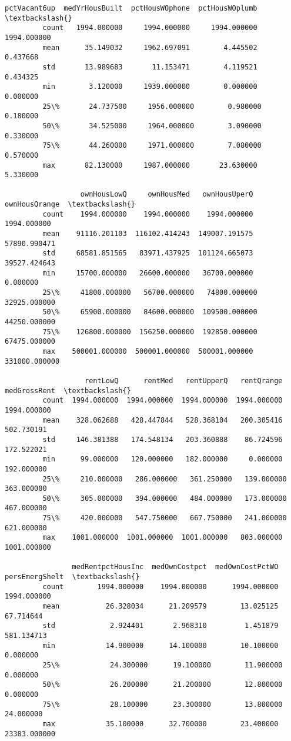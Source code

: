 \documentclass[11pt]{llncs}
\begin{document}
\begin{Verbatim}[commandchars=\\\{\}]
                pctVacant6up  medYrHousBuilt  pctHousWOphone  pctHousWOplumb  \textbackslash{}
         count   1994.000000     1994.000000     1994.000000     1994.000000   
         mean      35.149032     1962.697091        4.445502        0.437668   
         std       13.989683       11.153471        4.119521        0.434325   
         min        3.120000     1939.000000        0.000000        0.000000   
         25\%       24.737500     1956.000000        0.980000        0.180000   
         50\%       34.525000     1964.000000        3.090000        0.330000   
         75\%       44.260000     1971.000000        7.080000        0.570000   
         max       82.130000     1987.000000       23.630000        5.330000   
         
                  ownHousLowQ     ownHousMed   ownHousUperQ  ownHousQrange  \textbackslash{}
         count    1994.000000    1994.000000    1994.000000    1994.000000   
         mean    91116.201103  116102.414243  149007.191575   57890.990471   
         std     68581.851565   83971.437925  101124.665073   39527.424643   
         min     15700.000000   26600.000000   36700.000000       0.000000   
         25\%     41800.000000   56700.000000   74800.000000   32925.000000   
         50\%     65900.000000   84600.000000  109500.000000   44250.000000   
         75\%    126800.000000  156250.000000  192850.000000   67475.000000   
         max    500001.000000  500001.000000  500001.000000  331000.000000   
         
                   rentLowQ      rentMed   rentUpperQ   rentQrange  medGrossRent  \textbackslash{}
         count  1994.000000  1994.000000  1994.000000  1994.000000   1994.000000   
         mean    328.062688   428.447844   528.368104   200.305416    502.730191   
         std     146.381388   174.548134   203.360888    86.724596    172.522021   
         min      99.000000   120.000000   182.000000     0.000000    192.000000   
         25\%     210.000000   286.000000   361.250000   139.000000    363.000000   
         50\%     305.000000   394.000000   484.000000   173.000000    467.000000   
         75\%     420.000000   547.750000   667.750000   241.000000    621.000000   
         max    1001.000000  1001.000000  1001.000000   803.000000   1001.000000   
         
                medRentpctHousInc  medOwnCostpct  medOwnCostPctWO  persEmergShelt  \textbackslash{}
         count        1994.000000    1994.000000      1994.000000     1994.000000   
         mean           26.328034      21.209579        13.025125       67.714644   
         std             2.924401       2.968310         1.451879      581.134713   
         min            14.900000      14.100000        10.100000        0.000000   
         25\%            24.300000      19.100000        11.900000        0.000000   
         50\%            26.200000      21.200000        12.800000        0.000000   
         75\%            28.100000      23.300000        13.800000       24.000000   
         max            35.100000      32.700000        23.400000    23383.000000   
         

\end{Verbatim}
\end{document}
